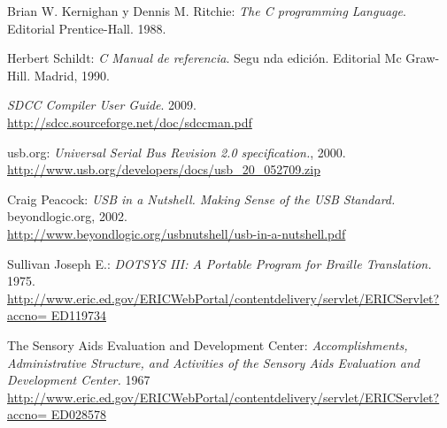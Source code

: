 \begin{thebibliography}{99}
 Brian W. Kernighan y Dennis M. Ritchie: \emph{The C
programming Language}. Editorial Prentice-Hall. 1988.

 Herbert Schildt: \emph{C Manual de referencia}. Segu
nda edici\'on. Editorial Mc Graw-Hill. Madrid, 1990.

\emph{SDCC Compiler User Guide}. 2009.\\
\url{http://sdcc.sourceforge.net/doc/sdccman.pdf}

 usb.org: \emph{Universal Serial Bus Revision 2.0
specification.}, 2000.\\
\url{http://www.usb.org/developers/docs/usb_20_052709.zip}

 Craig Peacock: \emph{USB in a Nutshell. Making Sense of
the USB Standard.} beyondlogic.org, 2002.\\
\url{http://www.beyondlogic.org/usbnutshell/usb-in-a-nutshell.pdf} 

 Sullivan Joseph E.: \emph{DOTSYS III: A Portable Program for
Braille Translation.} 1975.\\
\url{
http://www.eric.ed.gov/ERICWebPortal/contentdelivery/servlet/ERICServlet?accno=
ED119734}

 The Sensory Aids Evaluation and Development Center:
\emph{Accomplishments, Administrative Structure, and Activities of the Sensory
Aids Evaluation and Development Center.} 1967\\
\url{
http://www.eric.ed.gov/ERICWebPortal/contentdelivery/servlet/ERICServlet?accno=
ED028578}
\end{thebibliography}